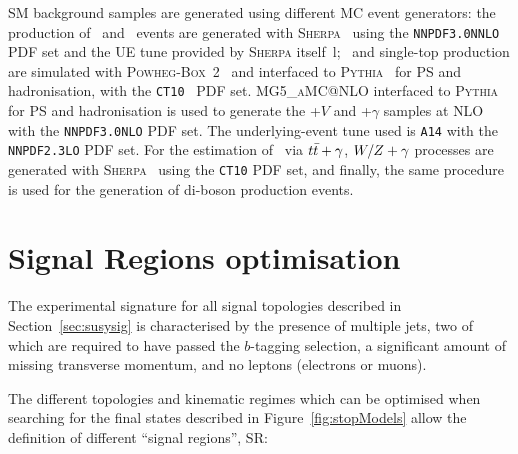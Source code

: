 			\ac{SM} background samples are generated using different \ac{MC} event generators: the production of \Zjets\ and \Wjets\ events are generated with \textsc{Sherpa}~\cite{Sherpa} using the \verb+NNPDF3.0NNLO+~\cite{PDFs} \ac{PDF} set and the \ac{UE} tune provided by \textsc{Sherpa} itself~\cite{Sherpa}l; \ttbar\ and single-top production are simulated with \textsc{Powheg-Box}~2~\cite{powheg-box} and interfaced to \textsc{Pythia}~\cite{Pythia2006} for \ac{PS} and hadronisation, with the \verb+CT10+~\cite{CT10} \ac{PDF} set. {\scshape MG5\_aMC\/@NLO} interfaced to \textsc{Pythia} for \ac{PS} and hadronisation is used to generate the \ttbar+$V$ and \ttbar+$\gamma$ samples at \ac{NLO} with the \verb+NNPDF3.0NLO+ \ac{PDF} set. The underlying-event tune used is \verb+A14+ with the \verb+NNPDF2.3LO+ \ac{PDF} set. For the estimation of \ttZ\ via $t\bar{t}+\gamma$, $W/Z+\gamma$ processes are generated with \textsc{Sherpa}~\cite{Sherpa} using the \verb+CT10+ \ac{PDF} set, and finally, the same procedure is used for the generation of di-boson production events.


	\section{Signal Regions optimisation}
	\label{sec:SRs}

		The experimental signature for all signal topologies described in Section~\ref{sec:susysig} is characterised by the presence of multiple jets, two of which are required to have passed the $b$-tagging selection, a significant amount of missing transverse momentum, and no leptons (electrons or muons).

		The different topologies and kinematic regimes which can be optimised when searching for the final states described in Figure~\ref{fig:stopModels} allow the definition of different ``signal regions'', \ac{SR}: 
		
